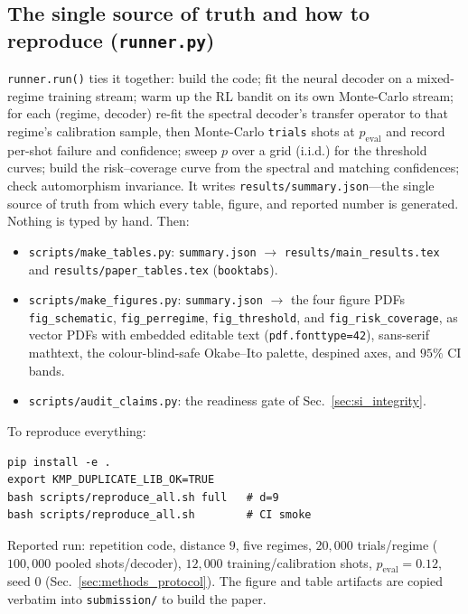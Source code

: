 \documentclass[reprint,aps,prxquantum,amsmath,amssymb,floatfix,nofootinbib,longbibliography]{revtex4-2}
\theoremstyle{definition}
\theoremstyle{remark}
\theoremstyle{plain}
\begin{document}
\subsection{The single source of truth and how to reproduce (\texttt{runner.py})}
\label{sec:si_reproduce}
\texttt{runner.run()} ties it together: build the code; fit the neural decoder on a mixed-regime training stream; warm up the RL bandit on its own Monte-Carlo stream; for each (regime, decoder) re-fit the spectral decoder's transfer operator to that regime's calibration sample, then Monte-Carlo \texttt{trials} shots at $p_{\mathrm{eval}}$ and record per-shot failure and confidence; sweep $p$ over a grid (i.i.d.) for the threshold curves; build the risk--coverage curve from the spectral and matching confidences; check automorphism invariance. It writes \texttt{results/summary.json}---the single source of truth from which every table, figure, and reported number is generated. Nothing is typed by hand. Then:
\begin{itemize}[leftmargin=1.5em]
  \item \texttt{scripts/make\_tables.py}: \texttt{summary.json} $\to$ \texttt{results/main\_results.tex} and \texttt{results/paper\_tables.tex} (\texttt{booktabs}).
  \item \texttt{scripts/make\_figures.py}: \texttt{summary.json} $\to$ the four figure PDFs \texttt{fig\_schematic}, \texttt{fig\_perregime}, \texttt{fig\_threshold}, and \texttt{fig\_risk\_coverage}, as vector PDFs with embedded editable text (\texttt{pdf.fonttype=42}), sans-serif mathtext, the colour-blind-safe Okabe--Ito palette, despined axes, and $95\%$ CI bands.
  \item \texttt{scripts/audit\_claims.py}: the readiness gate of Sec.~\ref{sec:si_integrity}.
\end{itemize}
To reproduce everything:
\begin{verbatim}
pip install -e .
export KMP_DUPLICATE_LIB_OK=TRUE
bash scripts/reproduce_all.sh full   # d=9
bash scripts/reproduce_all.sh        # CI smoke
\end{verbatim}
Reported run: repetition code, distance $9$, five regimes, $20{,}000$ trials/regime ($100{,}000$ pooled shots/decoder), $12{,}000$ training/calibration shots, $p_{\mathrm{eval}}=0.12$, seed $0$ (Sec.~\ref{sec:methods_protocol}). The figure and table artifacts are copied verbatim into \texttt{submission/} to build the paper.
\end{document}
